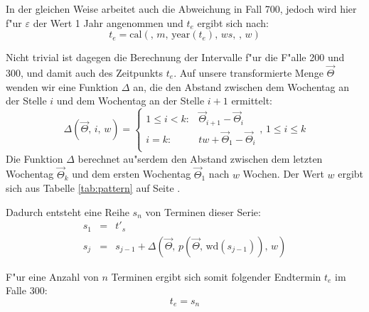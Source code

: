 \documentclass[a4paper]{article}
\newcommand*{\yearf}{\mathrm{year}}
\newcommand*{\calf}{\mathrm{cal}}
\numberwithin{equation}{section}
\begin{document}
\noindent In der gleichen Weise arbeitet auch die Abweichung in Fall 700, jedoch
wird hier f"ur $\varepsilon$ der Wert 1 Jahr angenommen und $t_e$ ergibt sich
nach:
\begin{equation}t_e = \calf(,\,m,\,\yearf(t_e),\,ws,\,,\,w)\end{equation}

\noindent Nicht trivial ist dagegen die Berechnung der Intervalle f"ur die
F"alle 200 und 300, und damit auch des Zeitpunkts $t_e$. Auf unsere
transformierte Menge $\vec{\Theta}$ wenden wir eine Funktion $\Delta$ an, die
den Abstand zwischen dem Wochentag an der Stelle $i$ und dem Wochentag an der
Stelle $i+1$ ermittelt:
\begin{equation}
\Delta(\vec{\Theta},\,i,\,w) = \left\{\begin{array}{ll}
1 \le i < k : & \vec{\Theta}_{i+1} - \vec{\Theta}_i \\
i = k : & tw + \vec{\Theta}_{1} - \vec{\Theta}_{i} \\
\end{array}\right.,\,1 \le i \le k
\end{equation}
Die Funktion $\Delta$ berechnet au"serdem den Abstand zwischen dem letzten
Wochentag $\vec{\Theta}_k$ und dem ersten Wochentag $\vec{\Theta}_1$ nach $w$
Wochen. Der Wert $w$ ergibt sich aus Tabelle \ref{tab:pattern} auf Seite
\pageref{tab:pattern}.

Dadurch entsteht eine Reihe $s_n$ von Terminen dieser Serie:
\begin{eqnarray}
s_1 & = & t'_s \\
s_{j} & = & s_{j-1} + \Delta(\vec{\Theta},\,p(\vec{\Theta},\,\textrm{wd}(s_{j-1})),\,w)
\end{eqnarray}

\noindent F"ur eine Anzahl von $n$ Terminen ergibt sich somit folgender
Endtermin $t_e$ im Falle 300:
\begin{equation}
\label{eqn:sn300}t_e = s_n
\end{equation}



%
%
%
%
\end{document}
